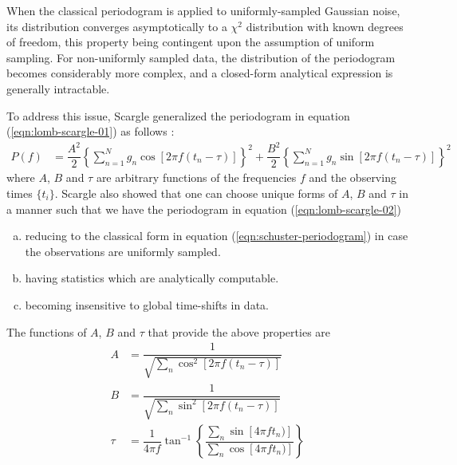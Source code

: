     			When the classical periodogram is applied to uniformly-sampled Gaussian noise, its distribution converges asymptotically to a $\chi^2$ distribution with known degrees of freedom, this property being contingent upon the assumption of uniform sampling. For non-uniformly sampled data, the distribution of the periodogram becomes considerably more complex, and a closed-form analytical expression is generally intractable.
    			
    			To address this issue, Scargle generalized the periodogram in equation (\ref{eqn:lomb-scargle-01}) as follows \cite{scargle1982studies}:
    			\begin{align}
    				P(f)&=\dfrac{A^2}{2}\left\lbrace \sum_{n=1}^{N}{g_n\cos{[2\pi f(t_n-\tau)]}} \right\rbrace^2 + \dfrac{B^2}{2}\left\lbrace \sum_{n=1}^{N}{g_n\sin{[2\pi f(t_n-\tau)]}} \right\rbrace^2 \label{eqn:lomb-scargle-02}
    			\end{align}
    			where $A$, $B$ and $\tau$ are arbitrary functions of the frequencies $f$ and the observing times $\{t_i\}$. Scargle also showed that one can choose unique forms of $A$, $B$ and $\tau$ in a manner such that we have the periodogram in equation (\ref{eqn:lomb-scargle-02})
    			\begin{enumerate}[a)]
    				\item reducing to the classical form in equation (\ref{eqn:schuster-periodogram}) in case the observations are uniformly sampled.
    				\item having statistics which are analytically computable.
    				\item becoming insensitive to global time-shifts in data.
    			\end{enumerate}
    			The functions of $A$, $B$ and $\tau$ that provide the above properties are
    			\begin{align*}
    				A&=\dfrac{1}{\sqrt{\sum_{n}{\cos^2{[2\pi f(t_n-\tau)]}}}} \\
    				B&=\dfrac{1}{\sqrt{\sum_{n}{\sin^2{[2\pi f(t_n-\tau)]}}}} \\
    				\tau&=\dfrac{1}{4\pi f}\tan^{-1}{\left\lbrace \dfrac{\sum_{n}{\sin{[4\pi ft_n)]}}}{\sum_{n}{\cos{[4\pi ft_n)]}}} \right\rbrace}
    			\end{align*}
